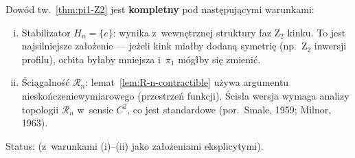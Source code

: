\begin{remark}%
\label{rem:pi1-status}
Dow\'od tw.~\ref{thm:pi1-Z2} jest \textbf{kompletny}
pod nast\k{e}puj\k{a}cymi warunkami:
\begin{enumerate}[(i),nosep]
  \item Stabilizator $H_n = \{e\}$: wynika z~wewn\k{e}trznej
        struktury faz Z$_2$ kinku. To jest najsilniejsze
        za\l{}o\.zenie --- je\.zeli kink mia\l{}by
        dodan\k{a} symetri\k{e} (np.\ Z$_2$ inwersji profilu),
        orbita by\l{}aby mniejsza i~$\pi_1$ m\'og\l{}by
        si\k{e} zmieni\'c.
  \item \'Sci\k{a}galno\'s\'c $\mathcal{R}_n$:
        lemat~\ref{lem:R-n-contractible} u\.zywa argumentu
        nieskończeniewymiarowego (przestrze\'n funkcji).
        \'Scis\l{}a wersja wymaga analizy topologii
        $\mathcal{R}_n$ w~sensie $C^2$,
        co jest standardowe
        (por.\ Smale, 1959; Milnor, 1963).
\end{enumerate}
Status:  (z~warunkami (i)--(ii)
jako za\l{}o\.zeniami eksplicytymi).
\end{remark}
